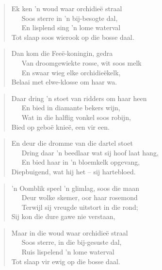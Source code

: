 \begin{verse}
Ek ken ’n woud waar orchidie\"e straal \\
\ \ \ Soos sterre in ’n bij-besogte dal, \\
\ \ \ En lisplend sing ’n lome waterval \\
Tot slaap soos wierook op die bosse daal. \\
\end{verse}

\begin{verse}
Dan kom die Fee\"e-koningin, gedra \\
\ \ \ Van droomgewiekte rosse, wit soos melk \\
\ \ \ En swaar wieg elke orchidie\"ekelk, \\
Belaai met elwe-klosse om haar wa. \\
\end{verse}

\begin{verse}
Daar dring ’n stoet van ridders om haar heen \\
\ \ \ En bied in diamante bekers wijn, \\
\ \ \ Wat in die halflig vonkel soos robijn, \\
Bied op gebo\"e knie\"e, een vir een. \\
\end{verse}

\begin{verse}
En deur die dromme van die dartel stoet \\
\ \ \ Dring daar ’n beedlaar wat sij hoof laat hang, \\
\ \ \ En bied haar in ’n bloemkelk opgevang, \\
Diepbuigend, wat hij het -- sij hartebloed. \\
\end{verse}

\begin{verse}
’n Oomblik speel ’n glimlag, soos die maan \\
\ \ \ Deur wolke skemer, oor haar rosemond \\
\ \ \ Terwijl sij vreugde uitstort in die rond; \\
Sij kon die dure gawe nie verstaan, \\
\end{verse}

\begin{verse}
Maar in die woud waar orchidie\"e straal \\
\ \ \ Soos sterre, in die bij-gesuste dal, \\
\ \ \ Ruis lispelend ’n lome waterval \\
Tot slaap vir ewig op die bosse daal.
\end{verse}